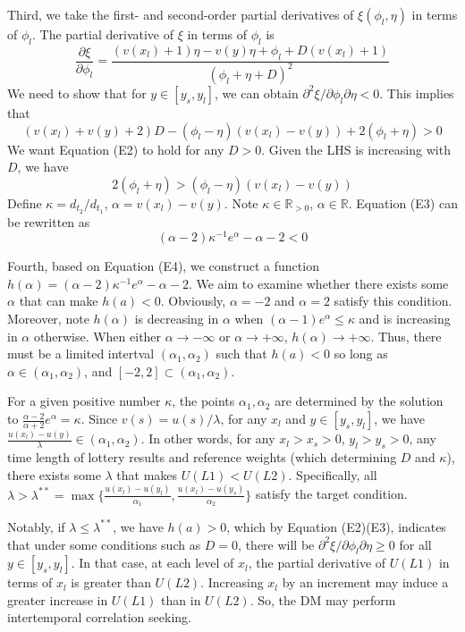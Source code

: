 \documentclass[
  12pt,
]{article}
\begin{document}
Third, we take the first- and second-order partial derivatives of
\(\xi(\phi_l,\eta)\) in terms of \(\phi_l\). The partial derivative of
\(\xi\) in terms of \(\phi_l\) is\[
\frac{\partial \xi}{\partial \phi_l}=\frac{(v(x_l)+1)\eta-v(y)\eta+\phi_l+D(v(x_l)+1)}{(\phi_l+\eta+D)^2}
\]We need to show that for \(y\in[y_s,y_l]\), we can obtain
\(\partial^2 \xi/\partial \phi_l\partial \eta<0\). This implies
that\[\tag{E2}
(v(x_l)+v(y)+2)D-(\phi_l-\eta)(v(x_l)-v(y))+2(\phi_l+\eta)>0
\]We want Equation (E2) to hold for any \(D>0\). Given the LHS is
increasing with \(D\), we have\[\tag{E3}
2(\phi_l+\eta)>(\phi_l-\eta)(v(x_l)-v(y))
\]Define \(\kappa=d_{t_2}/d_{t_1}\), \(\alpha=v(x_l)-v(y)\). Note
\(\kappa\in \mathbb{R}_{>0}\), \(\alpha\in\mathbb{R}\). Equation (E3)
can be rewritten as\[\tag{E4}
(\alpha-2)\kappa^{-1} e^{\alpha}-\alpha-2<0
\]

Fourth, based on Equation (E4), we construct a function
\(h(\alpha)=(\alpha-2)\kappa^{-1} e^\alpha-\alpha-2\). We aim to examine
whether there exists some \(\alpha\) that can make \(h(a)<0\).
Obviously, \(\alpha=-2\) and \(\alpha=2\) satisfy this condition.
Moreover, note \(h(\alpha)\) is decreasing in \(\alpha\) when
\((\alpha-1)e^{\alpha}\leq \kappa\) and is increasing in \(\alpha\)
otherwise. When either \(\alpha\rightarrow -\infty\) or
\(\alpha \rightarrow +\infty\), \(h(\alpha)\rightarrow +\infty\). Thus,
there must be a limited intertval \((\alpha_1,\alpha_2)\) such that
\(h(a)<0\) so long as \(\alpha\in(\alpha_1,\alpha_2)\), and
\([-2,2]\subset(\alpha_1,\alpha_2)\).

For a given positive number \(\kappa\), the points \(\alpha_1,\alpha_2\)
are determined by the solution to
\(\frac{\alpha-2}{\alpha+2}e^{\alpha}=\kappa\). Since
\(v(s)=u(s)/\lambda\), for any \(x_l\) and \(y\in[y_s,y_l]\), we have
\(\frac{u(x_l)-u(y)}{\lambda}\in(\alpha_1,\alpha_2)\). In other words,
for any \(x_l>x_s>0\), \(y_l>y_s>0\), any time length of lottery results
and reference weights (which determining \(D\) and \(\kappa\)), there
exists some \(\lambda\) that makes \(U(L1)<U(L2)\). Specifically, all
\(\lambda>\lambda^{**} ={\max}\{\frac{u(x_l)-u(y_l)}{\alpha_1},\frac{u(x_l)-u(y_s)}{\alpha_2}\}\)
satisfy the target condition.

Notably, if \(\lambda\leq\lambda^{**}\), we have \(h(a)>0\), which by
Equation (E2)(E3), indicates that under some conditions such as \(D=0\),
there will be \(\partial^2 \xi/\partial \phi_l\partial \eta\geq0\) for
all \(y\in[y_s,y_l]\). In that case, at each level of \(x_l\), the
partial derivative of \(U(L1)\) in terms of \(x_l\) is greater than
\(U(L2)\). Increasing \(x_l\) by an increment may induce a greater
increase in \(U(L1)\) than in \(U(L2)\). So, the DM may perform
intertemporal correlation seeking.
\end{document}
